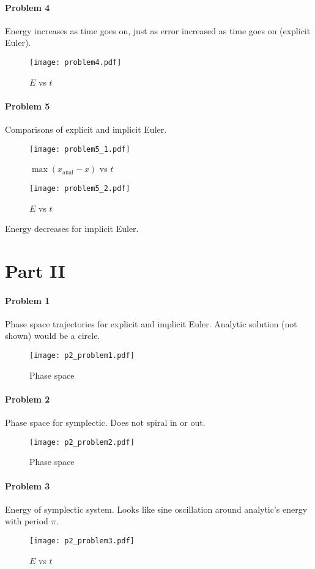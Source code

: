 \documentclass[12pt, oneside, letterpaper, fleqn]{article}
\begin{document}
\pagebreak
\paragraph{Problem 4}
Energy increases as time goes on, just as error increased as time goes
on (explicit Euler).
\begin{figure}[htbp]
\caption{$E$ vs $t$}
\texttt{[image: problem4.pdf]}
\end{figure}

\pagebreak
\paragraph{Problem 5}
Comparisons of explicit and implicit Euler.

\begin{figure}[htbp]
\caption{$\max(x_\text{anal} - x)$ vs $t$}
\texttt{[image: problem5\_1.pdf]}
\end{figure}
\pagebreak
\begin{figure}[htbp]
\caption{$E$ vs $t$}
\texttt{[image: problem5\_2.pdf]}
\end{figure}
Energy decreases for implicit Euler.

\pagebreak
\section{Part II}
\paragraph{Problem 1}
Phase space trajectories for explicit and implicit Euler. Analytic
solution (not shown) would be a circle.
\begin{figure}[htbp]
\caption{Phase space}
\texttt{[image: p2\_problem1.pdf]}
\end{figure}

\pagebreak
\paragraph{Problem 2}
Phase space for symplectic. Does not spiral in or out.
\begin{figure}[htbp]
\caption{Phase space}
\texttt{[image: p2\_problem2.pdf]}
\end{figure}

\pagebreak
\paragraph{Problem 3}
Energy of symplectic system. Looks like sine oscillation around
analytic's energy with period $\pi$.
\begin{figure}[htbp]
\caption{$E$ vs $t$}
\texttt{[image: p2\_problem3.pdf]}
\end{figure}
\end{document}
